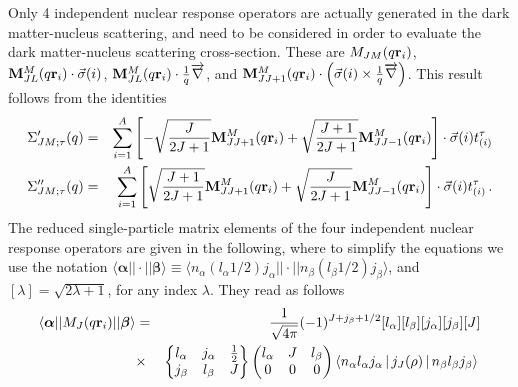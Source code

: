 \documentclass[11pt,a4paper]{article}
\begin{document}
Only 4 independent nuclear response operators are actually generated in the dark matter-nucleus scattering, and need to be considered in order to evaluate the dark matter-nucleus scattering cross-section. These are $M_{JM}(q{\bf{r}}_i)$, ${\bf{M}}_{JL}^M(q{\bf{r}}_i)\cdot{\vec{\sigma}(i)}$, ${\bf{M}}^M_{JL}(q{\bf{r}}_i)\cdot\frac{1}{q} \overrightarrow{\nabla}$, and ${\bf{M}}^M_{JJ+1}(q{\bf{r}}_i)\cdot\left({\vec{\sigma}(i)}\times\frac{1}{q} \overrightarrow{\nabla}\right)$. This result follows from the identities
\begin{eqnarray}
\Sigma'_{JM;\tau}(q) &=& \sum_{i=1}^{A} \left[-\sqrt{\frac{J}{2J+1}}{\bf{M}}_{JJ+1}^{M}(q {\bf{r}}_i)  + \sqrt{\frac{J+1}{2J+1}}{\bf{M}}_{JJ-1}^{M}(q {\bf{r}}_i) \right] \cdot \vec{\sigma}(i) t^{\tau}_{(i)}\nonumber\\
\Sigma''_{JM;\tau}(q) &=&\sum_{i=1}^{A} \left[\sqrt{\frac{J+1}{2J+1}} {\bf{M}}_{JJ+1}^{M}(q {\bf{r}}_i) + \sqrt{\frac{J}{2J+1}}{\bf{M}}_{JJ-1}^{M}(q {\bf{r}}_i) \right] \cdot \vec{\sigma}(i) t^{\tau}_{(i)} \,.
\label{eq:S1S2bis}
\end{eqnarray}
The reduced single-particle matrix elements of the four independent nuclear response operators are given in the following, where to simplify the equations we use the notation $\langle \boldsymbol{\alpha}||\cdot|| \boldsymbol{\beta} \rangle \equiv \langle n_\alpha(l_\alpha1/2)j_\alpha||\cdot|| n_\beta(l_\beta1/2)j_\beta\rangle$, and $[\lambda]=\sqrt{2\lambda+1}$, for any index $\lambda$. They read as follows
\begin{eqnarray}
\label{eq:m1}
  \langle \boldsymbol{\alpha}||M_{J}(q{\bf{r}}_i)||\boldsymbol{\beta} \rangle &=&
\frac{1}{\sqrt{4\pi}}(-1)^{J+j_\beta+1/2}[l_\alpha][l_\beta][j_\alpha][j_\beta][J] \nonumber\\
&\times& \begin{Bmatrix}
    l_\alpha&j_\alpha&\frac{1}{2}\\
    j_\beta&l_\beta&J
\end{Bmatrix}
\begin{pmatrix}
    l_\alpha&J&l_\beta\\
    0&0&0
\end{pmatrix}
\Braket{n_\alpha l_\alpha j_\alpha |j_{J}(\rho)|n_\beta l_\beta j_\beta}\,\nonumber\\
\end{eqnarray}
\end{document}
